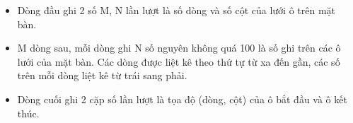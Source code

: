 \begin{itemize}
	\item     Dòng đầu ghi 2 số M, N lần lượt là số dòng và số cột của lưới ô trên mặt bàn.   
	\item     M dòng sau, mỗi dòng ghi N số nguyên không quá 100 là số ghi trên các ô lưới của mặt bàn. Các dòng được liệt kê theo thứ tự từ xa đến gần, các số trên mỗi dòng liệt kê từ trái sang phải.   
	\item     Dòng cuối ghi 2 cặp số lần lượt là tọa độ (dòng, cột) của ô bắt đầu và ô kết thúc.   
\end{itemize}
